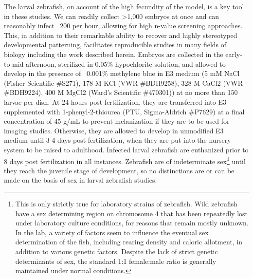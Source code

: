 The larval zebrafish, on account of the high fecundity of the model, is a key tool in these studies. We can readily collect >1,000 embryos at once and can reasonably infect ~200 per hour, allowing for high n-value screening approaches. This, in addition to their remarkable ability to recover and highly stereotyped developmental patterning, facilitates reproducible studies in many fields of biology including the work described herein. Embryos are collected in the early- to mid-afternoon, sterilized in 0.05\% hypochlorite solution, and allowed to develop in the presence of ~0.001\% methylene blue in E3 medium (5 mM NaCl (Fisher Scientific \#S271), 178 \textmu M KCl (VWR \#BDH9258), 328 \textmu M CaCl2 (VWR \#BDH9224), 400 \textmu M MgCl2 (Ward's Scientific \#470301)) at no more than 150 larvae per dish. At 24 hours post fertilization, they are transferred into E3 supplemented with 1-phenyl-2-thiourea (PTU, Sigma-Aldrich \#P7629) at a final concentration of 45 \textmu g/mL to prevent melanization if they are to be used for imaging studies. Otherwise, they are allowed to develop in unmodified E3 medium until 3-4 days post fertilization, when they are put into the nursery system to be raised to adulthood. Infected larval zebrafish are euthanized prior to 8 days post fertilization in all instances. Zebrafish are of indeterminate sex\footnote{This is only strictly true for laboratory strains of zebrafish. Wild zebrafish have a sex determining region on chromosome 4 that has been repeatedly lost under laboratory culture conditions, for reasons that remain mostly unknown. In the lab, a variety of factors seem to influence the eventual sex determination of the fish, including rearing density and caloric allotment, in addition to various genetic factors. Despite the lack of strict genetic determinants of sex, the standard 1:1 female:male ratio is generally maintained under normal conditions.} until they reach the juvenile stage of development, so no distinctions are or can be made on the basis of sex in larval zebrafish studies.

